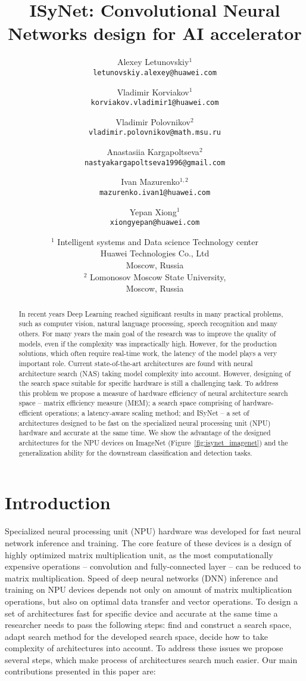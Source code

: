 \documentclass[letterpaper]{article}
\title{ISyNet: Convolutional Neural Networks design for AI accelerator}
\author {
    Alexey Letunovskiy$^{1}$\\
    {\tt\small letunovskiy.alexey@huawei.com}\\
    \and
    Vladimir Korviakov$^{1}$\\
    {\tt\small korviakov.vladimir1@huawei.com}\\
    \and
    Vladimir Polovnikov$^{2}$\\
    {\tt\small vladimir.polovnikov@math.msu.ru}\\
    \and
    Anastasiia Kargapoltseva$^{2}$\\
    {\tt\small nastyakargapoltseva1996@gmail.com}\\
    \and
    Ivan Mazurenko$^{1,2}$\\
    {\tt\small mazurenko.ivan1@huawei.com}\\
    \and
    Yepan Xiong$^{1}$\\
    {\tt\small xiongyepan@huawei.com}\\
    \and
    $^{1}$ Intelligent systems and Data science Technology center\\
    Huawei Technologies Co., Ltd\\
    Moscow, Russia\\
    $^{2}$ Lomonosov Moscow State University,\\
    Moscow, Russia
}
\begin{document}
\maketitle

\begin{abstract}
	In recent years Deep Learning reached significant results in many practical problems, such as computer vision, natural language processing, speech recognition and many others. For many years the main goal of the research was to improve the quality of models, even if the complexity was impractically high. However, for the production solutions, which often require real-time work, the latency of the model plays a very important role. Current state-of-the-art architectures are found with neural architecture search (NAS) taking model complexity into account. However, designing of the search space suitable for specific hardware is still a challenging task. To address this problem we propose a measure of hardware efficiency of neural architecture search space -- matrix efficiency measure (MEM); a search space comprising of hardware-efficient operations; a latency-aware scaling method; and ISyNet -- a set of architectures designed to be fast on the specialized neural processing unit (NPU) hardware and accurate at the same time. We show the advantage of the designed architectures for the NPU devices on ImageNet (Figure~\ref{fig:isynet_imagenet}) and the generalization ability for the downstream classification and detection tasks.
\end{abstract}

\section{Introduction}
\label{sec:intro}
Specialized neural processing unit (NPU) hardware was developed for fast neural network inference and training. The core feature of these devices is a design of highly optimized matrix multiplication unit, as the most computationally expensive operations -- convolution and fully-connected layer -- can be reduced to matrix multiplication. Speed of deep neural networks (DNN) inference and training on NPU devices depends not only on amount of matrix multiplication operations, but also on optimal data transfer and vector operations. To design a set of architectures fast for specific device and accurate at the same time a researcher needs to pass the following steps: find and construct a search space, adapt search method for the developed search space, decide how to take complexity of architectures into account. To address these issues we propose several steps, which make process of architectures search much easier.
Our main contributions presented in this paper are:
\end{document}
